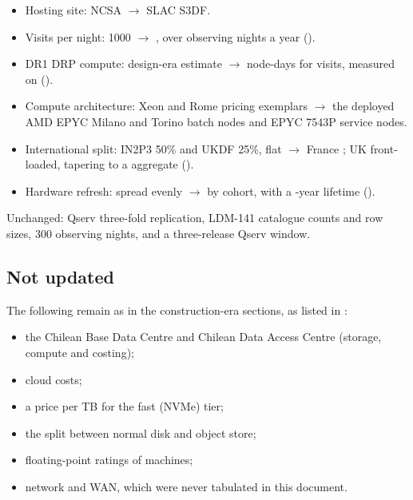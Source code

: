 \begin{itemize}
\item Hosting site: NCSA $\rightarrow$ SLAC S3DF.
\item Visits per night: 1000 $\rightarrow$ \smVisits{}, over \smNights{}
      observing nights a year ().
\item DR1 DRP compute: design-era estimate $\rightarrow$ \smDRoneNodeDays{}
      node-days for \smDRoneVisits{} visits, measured on \vthirty{}
      ().
\item Compute architecture: Xeon and Rome pricing exemplars $\rightarrow$ the
      deployed AMD EPYC Milano and Torino batch nodes and EPYC 7543P service
      nodes.
\item International split: IN2P3 50\% and UKDF 25\%, flat $\rightarrow$
      France \smFrShare{}; UK front-loaded, tapering to a \smUkShare{}
      aggregate ().
\item Hardware refresh: spread evenly $\rightarrow$ by cohort, with a
      \smLifeCompute{}-year lifetime ().
\end{itemize}

Unchanged: Qserv three-fold replication, LDM-141 catalogue counts and row
sizes, 300 observing nights, and a three-release Qserv window.

\subsection{Not updated}

The following remain as in the construction-era sections, as listed in
:
\begin{itemize}
\item the Chilean Base Data Centre and Chilean Data Access Centre (storage,
      compute and costing);
\item cloud costs;
\item a price per TB for the fast (NVMe) tier;
\item the split between normal disk and object store;
\item floating-point ratings of machines;
\item network and WAN, which were never tabulated in this document.
\end{itemize}
